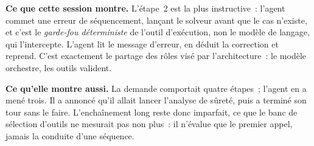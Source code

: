 \documentclass[12pt,a4paper,french]{report}
\begin{document}
\vspace{0.4cm}
\noindent
\textbf{Ce que cette session montre.} L'étape~2 est la plus instructive~:
l'agent commet une erreur de séquencement, lançant le solveur avant que le cas n'existe, et c'est le \emph{garde-fou déterministe} de l'outil d'exécution, non
le modèle de langage, qui l'intercepte. L'agent lit le message d'erreur, en
déduit la correction et reprend. C'est exactement le partage des rôles visé par
l'architecture~: le modèle orchestre, les outils valident.

\vspace{0.3cm}
\noindent
\textbf{Ce qu'elle montre aussi.} La demande comportait quatre étapes~; l'agent
en a mené trois. Il a annoncé qu'il allait lancer l'analyse de sûreté, puis a
terminé son tour sans le faire. L'enchaînement long reste donc imparfait, ce que
le banc de sélection d'outils ne mesurait pas non plus~: il n'évalue que le
premier appel, jamais la conduite d'une séquence.
\end{document}
